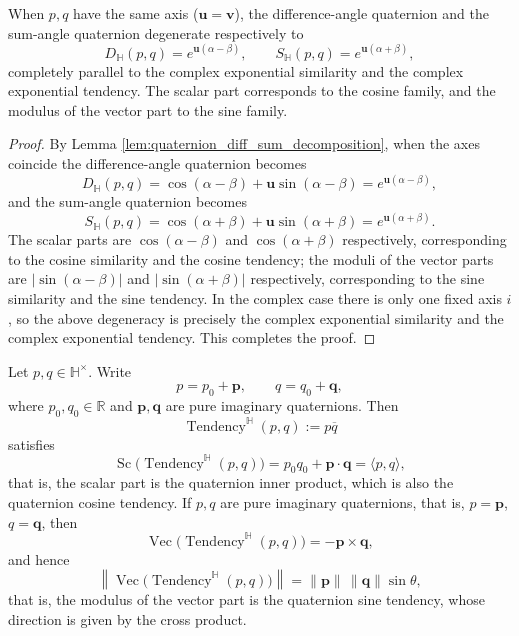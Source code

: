 \begin{theorem}\label{thm:quaternion_sum_rotation_degeneration}
When $p,q$ have the same axis ($\mathbf u=\mathbf v$), the difference-angle quaternion and the sum-angle quaternion degenerate respectively to
\[
D_{\mathbb H}(p,q)=e^{\mathbf u(\alpha-\beta)},\qquad
S_{\mathbb H}(p,q)=e^{\mathbf u(\alpha+\beta)},
\]
completely parallel to the complex exponential similarity and the complex exponential tendency. The scalar part corresponds to the cosine family, and the modulus of the vector part to the sine family.
\end{theorem}

\begin{proof}
By Lemma \ref{lem:quaternion_diff_sum_decomposition}, when the axes coincide the difference-angle quaternion becomes
\[
D_{\mathbb H}(p,q)=\cos(\alpha-\beta)+\mathbf u\sin(\alpha-\beta)=e^{\mathbf u(\alpha-\beta)},
\]
and the sum-angle quaternion becomes
\[
S_{\mathbb H}(p,q)=\cos(\alpha+\beta)+\mathbf u\sin(\alpha+\beta)=e^{\mathbf u(\alpha+\beta)}.
\]
The scalar parts are $\cos(\alpha-\beta)$ and $\cos(\alpha+\beta)$ respectively, corresponding to the cosine similarity and the cosine tendency; the moduli of the vector parts are $|\sin(\alpha-\beta)|$ and $|\sin(\alpha+\beta)|$ respectively, corresponding to the sine similarity and the sine tendency. In the complex case there is only one fixed axis $i$, so the above degeneracy is precisely the complex exponential similarity and the complex exponential tendency. This completes the proof.
\end{proof}

\begin{theorem}\label{thm:quaternion_exp_tendency_geometry}
Let $p,q\in\mathbb H^\times$. Write
\[
p=p_0+\mathbf p,\qquad q=q_0+\mathbf q,
\]
where $p_0,q_0\in\mathbb R$ and $\mathbf p,\mathbf q$ are pure imaginary quaternions. Then
\[
\operatorname{Tendency}^{\mathbb H}(p,q):=p\overline q
\]
satisfies
\[
\operatorname{Sc}\bigl(\operatorname{Tendency}^{\mathbb H}(p,q)\bigr)
=
p_0q_0+\mathbf p\cdot\mathbf q
=
\langle p,q\rangle,
\]
that is, the scalar part is the quaternion inner product, which is also the quaternion cosine tendency. If $p,q$ are pure imaginary quaternions, that is, $p=\mathbf p$, $q=\mathbf q$, then
\[
\operatorname{Vec}\bigl(\operatorname{Tendency}^{\mathbb H}(p,q)\bigr)
=
-\mathbf p\times\mathbf q,
\]
and hence
\[
\left\|\operatorname{Vec}\bigl(\operatorname{Tendency}^{\mathbb H}(p,q)\bigr)\right\|
=
\|\mathbf p\|\,\|\mathbf q\|\sin\theta,
\]
that is, the modulus of the vector part is the quaternion sine tendency, whose direction is given by the cross product.
\end{theorem}

